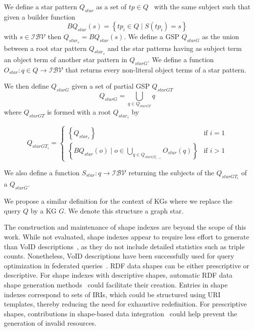 \begin{definition}\label{def:starPattern}
   We define a star pattern $Q_{star}$ as a set of $tp \in Q$~\cite{Karim2020} with the same subject such that 
   given a builder function 
   \begin{equation}
       BQ_{star}(s) = \left\{ tp_i \in Q \mid S(tp_i) = s \right\}
   \end{equation}
   with $s \in \mathcal{I}\mathcal{B}\mathcal{V}$ then $Q_{star_s} = BQ_{star}(s)$.
   We define a GSP $Q_{starG}$ as the union between a root star pattern $Q_{star_s}$
   and the star patterns having as subject term an object term of another star pattern in $Q_{starG}$.
   We define a function 
   $O_{star}: q \in Q \rightarrow  \mathcal{I}\mathcal{B}\mathcal{V}$
   that returns every non-literal object terms of a star pattern.

   We then define $Q_{starG}$ given a  set of partial GSP $Q_{starGT}$
   \begin{equation}
      Q_{starG} = \bigcup_{q \in Q_{starGT}} q
   \end{equation}
   where $Q_{starGT}$ is formed with a root $Q_{star_s}$ by

   \begin{equation}
           Q_{starGT_i} =
       \begin{cases}
         \left\{ Q_{star_s} \right\} & \text{if } i = 1 \\
           \left\{ BQ_{star}(o) \mid o \in \bigcup_{q \in Q_{starGT_{i-1}}} O_{star}(q) \right\} & \text{if } i>1
       \end{cases}
   \end{equation}

   We also define a function  
   $S_{star}: q \rightarrow  \mathcal{I}\mathcal{B}\mathcal{V}$
   returning the subjects of the $Q_{starGT_i}$ of a $Q_{starG}$.

   We propose a similar definition for the context of KGs where we replace the query $Q$ by a KG $G$. 
   We denote this structure a graph star.
   
\end{definition}

The construction and maintenance of shape indexes are beyond the scope of this work.
While not evaluated, shape indexes appear to require less effort to generate than VoID descriptions~\cite{Boehm2011}, as they do not include detailed statistics such as triple counts.
Nonetheless, VoID descriptions have been successfully used for query optimization in federated queries~\cite{Montoya2017}.
RDF data shapes can be either prescriptive or descriptive.
For shape indexes with descriptive shapes, automatic RDF data shape generation methods~\cite{fernandez2023extracting} could facilitate their creation.
Entries in shape indexes correspond to sets of IRIs, which could be structured using URI templates, thereby reducing the need for exhaustive redefinition.
For prescriptive shapes, contributions in shape-based data integration~\cite{LabraGayo2023} could help prevent the generation of invalid resources.


